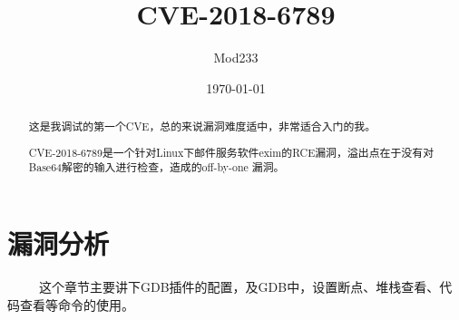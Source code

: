 \documentclass[12pt]{article}  %
\title{CVE-2018-6789}
\author{Mod233}
\date{\today}
\begin{document}

\maketitle
\begin{abstract}
这是我调试的第一个CVE，总的来说漏洞难度适中，非常适合入门的我。\par
CVE-2018-6789是一个针对Linux下邮件服务软件exim的RCE漏洞，溢出点在于没有对Base64解密的输入进行检查，造成的off-by-one 漏洞。
\end{abstract}
\tableofcontents
\section{漏洞分析} %
\ \ \ \ \ 这个章节主要讲下GDB插件的配置，及GDB中，设置断点、堆栈查看、代码查看等命令的使用。
\label{sec:熟悉latex}
\end{document}
